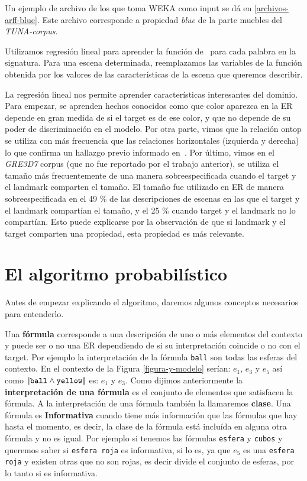 Un ejemplo de archivo de los que toma WEKA como input se d\'a en \ref{archivos-arff-blue}. Este archivo corresponde a propiedad {\it blue} 
de la parte muebles del \textit{TUNA-corpus}. 

Utilizamos regresi\'on lineal para aprender la funci\'on de
\puse\ para cada palabra en la signatura. Para una escena determinada, reemplazamos
las variables de la funci\'on obtenida por los valores de las caracter\'{i}sticas
de la escena que queremos describir.

La regresi\'on lineal nos permite aprender caracter\'{i}sticas interesantes
 del dominio. Para empezar, se aprenden hechos conocidos
como que color aparezca en la ER depende en gran medida de si el
target es de ese color, y que no depende de su
poder de discriminaci\'on en el modelo. Por otra parte, vimos que la relaci\'on ontop
 se utiliza con m\'as frecuencia que las relaciones horizontales
(izquierda y derecha) lo que confirma un hallazgo previo informado
en~\cite{viet:gene11}. Por \'ultimo, vimos en el
\textit{GRE3D7} corpus (que no fue reportado por el trabajo anterior), se utiliza el tama\~no
m\'as frecuentemente de una manera sobreespecificada cuando el
target y el landmark comparten el tama\~no. El tama\~no fue utilizado en ER de manera sobreespecificada en el 49 \% de
las descripciones de escenas en las que el target y el landmark compart\'ian el tama\~no,
y el 25 \% cuando target y el landmark no lo compart\'ian. Esto puede explicarse por la observaci\'on de que si landmark y el target comparten una propiedad, esta propiedad es m\'as relevante.

\section{El algoritmo probabil\'istico}
\label{sec:algoritmo_probabilistico}
Antes de empezar explicando el algoritmo, daremos algunos conceptos necesarios para entenderlo.

Una \textbf{f\'ormula} corresponde a una descripci\'on de uno o m\'as elementos del contexto y puede ser o no una ER dependiendo de 
si su interpretaci\'on coincide o no con el target. Por ejemplo la interpretaci\'on de la f\'ormula \texttt{ball} son todas las esferas 
del contexto. En el contexto de la Figura \ref{figura-y-modelo} ser\'ian: $e_1$, $e_3$ y $e_5$  as\'i como $|\!|\texttt{ball} \land \texttt{yellow}|\!|$ es: $e_1$ y $e_3$.
Como dijimos anteriormente la \textbf{interpretaci\'on de una f\'ormula} es el conjunto de elementos que satisfacen la f\'ormula. A la interpretaci\'on de una f\'ormula tambi\'en la llamaremos \textbf{clase}.
Una f\'ormula es \textbf{Informativa} cuando tiene m\'as informaci\'on que las f\'ormulas que hay hasta el momento, es decir, la clase de 
la f\'ormula est\'a inclu\'ida en alguna otra f\'ormula y no es igual. Por ejemplo si tenemos las f\'ormulas \texttt{esfera} y \texttt{cubos} y 
queremos saber si \texttt{esfera roja} es informativa, si lo es, ya que $e_5$ es una \texttt{esfera roja} y existen otras que no son rojas,
 es decir divide el conjunto de esferas, por lo tanto si es informativa. 


